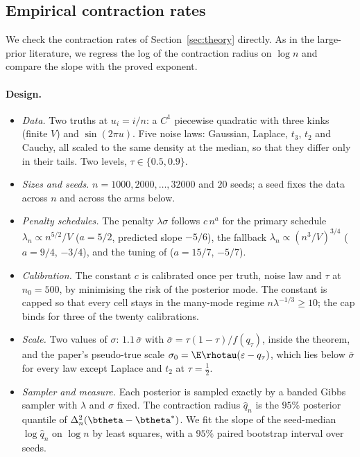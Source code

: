 
\subsection{Empirical contraction rates}
\label{sec:sim:rates}

We check the contraction rates of Section~\ref{sec:theory} directly. As in the large-prior literature, we regress the log of the contraction radius on $\log n$ and compare the slope with the proved exponent.

\paragraph{Design.}
\begin{itemize}
 \item \emph{Data.} Two truths at $u_i=i/n$: a $C^1$ piecewise quadratic with three kinks (finite $V$) and $\sin(2\pi u)$. Five noise laws: Gaussian, Laplace, $t_3$, $t_2$ and Cauchy, all scaled to the same density at the median, so that they differ only in their tails. Two levels, $\tau\in\{0.5,0.9\}$.
 \item \emph{Sizes and seeds.} $n=1000,2000,\ldots,32000$ and $20$ seeds; a seed fixes the data across $n$ and across the arms below.
 \item \emph{Penalty schedules.} The penalty $\lambda\sigma$ follows $c\,n^{a}$ for the primary schedule $\lambda_n\propto n^{5/2}/V$ ($a=5/2$, predicted slope $-5/6$), the fallback $\lambda_n\propto(n^3/V)^{3/4}$ ($a=9/4$, $-3/4$), and the tuning of \citet{madrid2022risk} ($a=15/7$, $-5/7$).
 \item \emph{Calibration.} The constant $c$ is calibrated once per truth, noise law and $\tau$ at $n_0=500$, by minimising the risk of the posterior mode. The constant is capped so that every cell stays in the many-mode regime $n\lambda^{-1/3}\ge 10$; the cap binds for three of the twenty calibrations.
 \item \emph{Scale.} Two values of $\sigma$: $1.1\,\bar\sigma$ with $\bar\sigma=\tau(1-\tau)/f(q_\tau)$, inside the theorem, and the paper's pseudo-true scale $\sigma_0=\E\rhotau(\varepsilon-q_\tau)$, which lies below $\bar\sigma$ for every law except Laplace and $t_2$ at $\tau=\tfrac12$.
 \item \emph{Sampler and measure.} Each posterior is sampled exactly by a banded Gibbs sampler with $\lambda$ and $\sigma$ fixed. The contraction radius $\hat q_n$ is the $95\%$ posterior quantile of $\Delta^2_n(\btheta-\btheta^*)$. We fit the slope of the seed-median $\log\hat q_n$ on $\log n$ by least squares, with a $95\%$ paired bootstrap interval over seeds.
\end{itemize}

